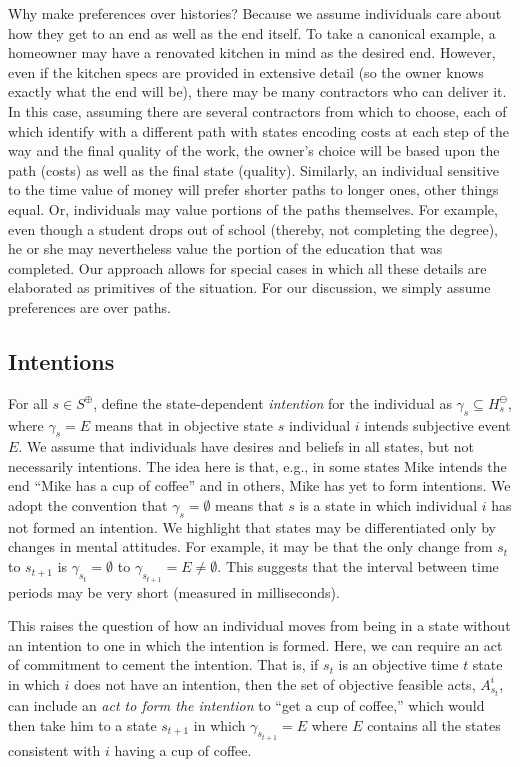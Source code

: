 \documentclass[
11pt,
titlepage,
reqno,
]{article}%
\theoremstyle{definition}
\begin{document}
Why make preferences over histories? Because we assume individuals care about how they get to an end as well as the end itself. 
To take a canonical example, a homeowner may have a renovated kitchen in mind as the desired end. 
However, even if the kitchen specs are provided in extensive detail (so the owner knows exactly what the end will be), there may be many contractors who can deliver it. 
In this case, assuming there are several contractors from which to choose, each of which identify with a different path with states encoding costs  at each step of the way and the final quality of the work, the owner's choice will be based upon the path (costs) as well as the final state (quality). 
Similarly, an individual sensitive to the time value of money will prefer shorter paths to longer ones, other things equal. 
Or, individuals may value portions of the paths themselves.
For example, even though a student drops out of school (thereby, not completing the degree), he or she may nevertheless value the portion of the education that was completed. 
Our approach allows for special cases in which all these details are elaborated as primitives of the situation. For our discussion, we simply assume preferences are over paths.    
	
	
\subsection{Intentions} \label{sec: intentions}
	
For all $s\in S^\oplus$, define the state-dependent \textit{intention} for the individual as $\gamma_s\subseteq H^\ominus_s$, where $\gamma_s=E$ means that in objective state $s$ individual $i$ intends subjective event $E$. 
We assume that individuals have desires and beliefs in all states, but not necessarily intentions. 
The idea here is that, e.g., in some states Mike intends the end ``Mike has a cup of coffee'' and in others, Mike has yet to form intentions.
We adopt the convention that $\gamma_s=\emptyset$ means that $s$ is a state in which individual $i$ has not formed an intention. 
We highlight that states may be differentiated only by changes in mental attitudes. 
For example, it may be that the only change from $s_t$ to $s_{t+1}$ is $\gamma_{s_t}=\emptyset$ to $\gamma_{s_{t+1}}=E\ne\emptyset$.
This suggests that the interval between time periods may be very short (measured in milliseconds).
	
This raises the question of how an individual moves from being in a state without an intention to one in which the intention is formed. 
Here, we can require an act of commitment to cement the intention. 
That is, if $s_t$ is an objective time $t$ state in which $i$ does not have an intention, then the set of objective feasible acts, $A^i_{s_t}$, can include an \textit{act to form the intention} to ``get a cup of coffee,'' which would then take him to a state $s_{t+1}$ in which $\gamma_{s_{t+1}}=E$ where $E$ contains all the states consistent with $i$ having a cup of coffee.
	
\end{document}
